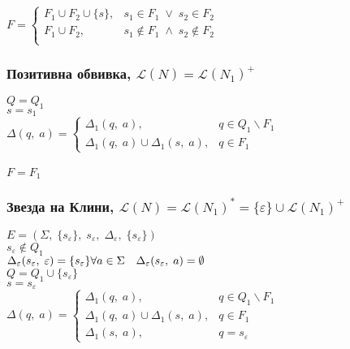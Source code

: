 \documentclass[12pt]{article}
\newcommand{\Lang}{\mathcal{L}}
\begin{document}
$F = \begin{cases}
  F_1 \cup F_2 \cup \{s\}, & s_1 \in F_1 \; \lor \; s_2 \in F_2 \\
  F_1 \cup F_2, & s_1 \notin F_1 \; \land \; s_2 \notin F_2 \\
\end{cases}$

\subsubsection*{Позитивна обвивка, $\Lang(N) = \Lang(N_1)^+$}

$Q = Q_1$ \\

$s = s_1$ \\

$\Delta(q, \; a) = \begin{cases}
    \Delta_1(q, \; a), & q \in Q_1 \backslash F_1 \\
    \Delta_1(q, \; a) \cup \Delta_1(s, \; a), & q \in F_1
\end{cases}$ \\\\

$F = F_1$

\subsubsection*{Звезда на Клини, $\Lang(N) = \Lang(N_1)^* = \{\varepsilon\} \cup \Lang(N_1)^+$}

$E = (\Sigma, \; \{s_\varepsilon\}, \; s_\varepsilon, \; \Delta_\varepsilon, \; \{s_\varepsilon\})$ \\

$s_\varepsilon \notin Q_1$ \\

$\Delta_\varepsilon(s_\varepsilon, \; \varepsilon) = \{s_\varepsilon\} \\\\
\forall a \in \Sigma \quad \Delta_\varepsilon(s_\varepsilon, \; a) = \emptyset $ \\

$Q = Q_1 \cup \{s_\varepsilon\}$ \\

$s = s_\varepsilon$ \\

$\Delta(q, \; a) = \begin{cases}
    \Delta_1(q, \; a), & q \in Q_1 \backslash F_1 \\
    \Delta_1(q, \; a) \cup \Delta_1(s, \; a), & q \in F_1 \\ 
    \Delta_1(s, \; a), & q = s_\varepsilon
\end{cases}$ \\\\
\end{document}
